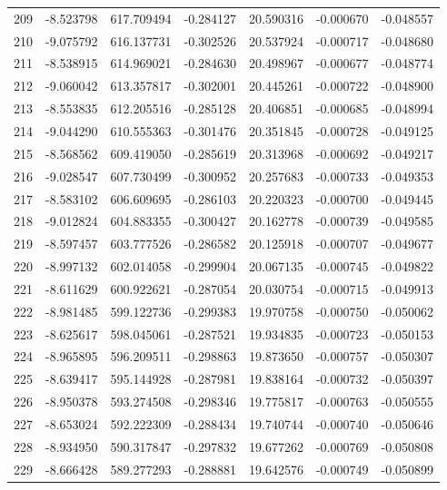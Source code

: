 \begin{tabular}{rrrrrrr}
 209 &  -8.523798 &  617.709494 & -0.284127 &   20.590316 &   -0.000670 & -0.048557 \\
 210 &  -9.075792 &  616.137731 & -0.302526 &   20.537924 &   -0.000717 & -0.048680 \\
 211 &  -8.538915 &  614.969021 & -0.284630 &   20.498967 &   -0.000677 & -0.048774 \\
 212 &  -9.060042 &  613.357817 & -0.302001 &   20.445261 &   -0.000722 & -0.048900 \\
 213 &  -8.553835 &  612.205516 & -0.285128 &   20.406851 &   -0.000685 & -0.048994 \\
 214 &  -9.044290 &  610.555363 & -0.301476 &   20.351845 &   -0.000728 & -0.049125 \\
 215 &  -8.568562 &  609.419050 & -0.285619 &   20.313968 &   -0.000692 & -0.049217 \\
 216 &  -9.028547 &  607.730499 & -0.300952 &   20.257683 &   -0.000733 & -0.049353 \\
 217 &  -8.583102 &  606.609695 & -0.286103 &   20.220323 &   -0.000700 & -0.049445 \\
 218 &  -9.012824 &  604.883355 & -0.300427 &   20.162778 &   -0.000739 & -0.049585 \\
 219 &  -8.597457 &  603.777526 & -0.286582 &   20.125918 &   -0.000707 & -0.049677 \\
 220 &  -8.997132 &  602.014058 & -0.299904 &   20.067135 &   -0.000745 & -0.049822 \\
 221 &  -8.611629 &  600.922621 & -0.287054 &   20.030754 &   -0.000715 & -0.049913 \\
 222 &  -8.981485 &  599.122736 & -0.299383 &   19.970758 &   -0.000750 & -0.050062 \\
 223 &  -8.625617 &  598.045061 & -0.287521 &   19.934835 &   -0.000723 & -0.050153 \\
 224 &  -8.965895 &  596.209511 & -0.298863 &   19.873650 &   -0.000757 & -0.050307 \\
 225 &  -8.639417 &  595.144928 & -0.287981 &   19.838164 &   -0.000732 & -0.050397 \\
 226 &  -8.950378 &  593.274508 & -0.298346 &   19.775817 &   -0.000763 & -0.050555 \\
 227 &  -8.653024 &  592.222309 & -0.288434 &   19.740744 &   -0.000740 & -0.050646 \\
 228 &  -8.934950 &  590.317847 & -0.297832 &   19.677262 &   -0.000769 & -0.050808 \\
 229 &  -8.666428 &  589.277293 & -0.288881 &   19.642576 &   -0.000749 & -0.050899 \\

\end{tabular}
